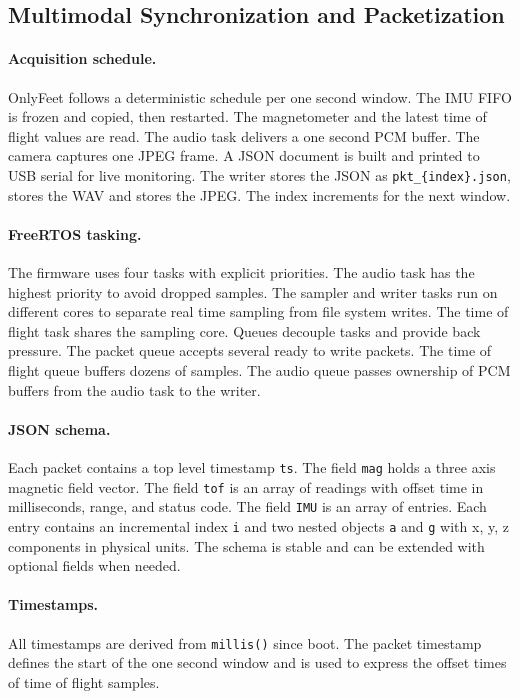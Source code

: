 \documentclass[manuscript,review,anonymous]{acmart}
\begin{document}
\subsection{Multimodal Synchronization and Packetization}
\paragraph{Acquisition schedule.}
OnlyFeet follows a deterministic schedule per one second window. The IMU FIFO is frozen and copied, then restarted. The magnetometer and the latest time of flight values are read. The audio task delivers a one second PCM buffer. The camera captures one JPEG frame. A JSON document is built and printed to USB serial for live monitoring. The writer stores the JSON as \texttt{pkt\_\{index\}.json}, stores the WAV and stores the JPEG. The index increments for the next window.

\paragraph{FreeRTOS tasking.}
The firmware uses four tasks with explicit priorities. The audio task has the highest priority to avoid dropped samples. The sampler and writer tasks run on different cores to separate real time sampling from file system writes. The time of flight task shares the sampling core. Queues decouple tasks and provide back pressure. The packet queue accepts several ready to write packets. The time of flight queue buffers dozens of samples. The audio queue passes ownership of PCM buffers from the audio task to the writer.

\paragraph{JSON schema.}
Each packet contains a top level timestamp \texttt{ts}. The field \texttt{mag} holds a three axis magnetic field vector. The field \texttt{tof} is an array of readings with offset time in milliseconds, range, and status code. The field \texttt{IMU} is an array of entries. Each entry contains an incremental index \texttt{i} and two nested objects \texttt{a} and \texttt{g} with x, y, z components in physical units. The schema is stable and can be extended with optional fields when needed.
\paragraph{Timestamps.}
All timestamps are derived from \texttt{millis()} since boot. The packet timestamp defines the start of the one second window and is used to express the offset times of time of flight samples.
\end{document}
